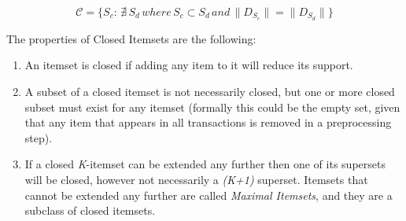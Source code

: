 \documentclass{sig-alternate}
\begin{document}
\begin{equation}\label{eq:Closed}\mathcal{C} = \{S_c:\, \nexists \, S_d \, where \, S_c  \subset S_d \, and \, \|D_{S_c}\| = \|D_{S_d}\|\}\end{equation}

The properties of Closed Itemsets are the following:
\begin{enumerate}
\item An itemset is closed if adding any item to it will reduce its support. 
\item A subset of a closed itemset is not necessarily closed, but one or more closed subset must exist for any itemset (formally this could be the empty set, given that any item that appears in all transactions is removed in a preprocessing step). 
\item If a closed \emph{K}-itemset can be extended any further then one of its supersets will be closed, however not necessarily a \emph{(K+1)} superset. Itemsets that cannot be extended any further are called \emph{Maximal Itemsets}, and they are a subclass of closed itemsets.
\end{enumerate}
\end{document}
